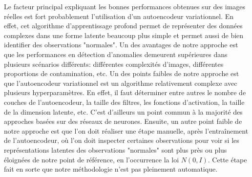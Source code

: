  Le facteur principal expliquant les bonnes performances obtenues sur des images réelles est fort probablement l'utilisation d'un autoencodeur variationnel. En effet, cet algorithme d'apprentissage profond permet de représenter des données complexes dans une forme latente beaucoup plus simple et permet aussi de bien identifier des observations "normales". Un des avantages de notre approche est que les performances en détection d'anomalies demeurent supérieures dans plusieurs scénarios différents: différentes complexités d'images, différentes proportions de contamination, etc. Un des points faibles de notre approche est que l'autoencodeur variationnel est un algorithme relativement complexe avec plusieurs hyperparamètres. En effet, il faut déterminer entre autres le nombre de couches de l'autoencodeur, la taille des filtres, les fonctions d'activation, la taille de la dimension latente, etc. C'est d'ailleurs un point commun à la majorité des approches basées sur des réseaux de neurones. Ensuite, un autre point faible de notre approche est que l'on doit réaliser une étape manuelle, après l'entraînement de l'autoencodeur, où l'on doit inspecter certaines observations pour voir si les représentations latentes des observations "normales" sont plus près ou plus éloignées de notre point de référence, en l'occurrence la loi $N(0,I)$. Cette étape fait en sorte que notre méthodologie n'est pas pleinement automatique.
 
